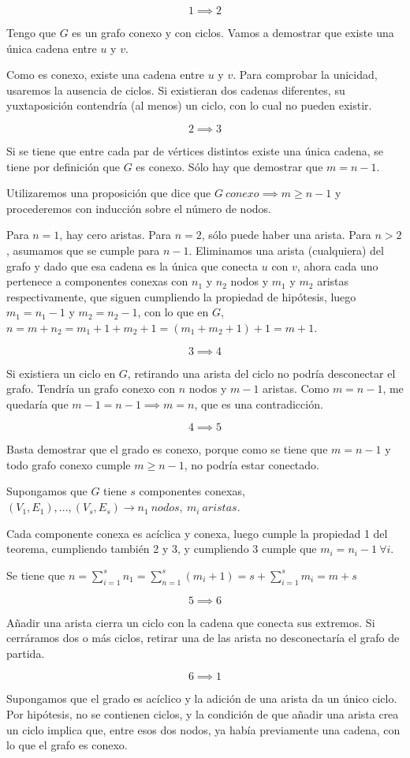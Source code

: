 \documentclass[openany]{book}
\begin{document}
\begin{demonstration}
  $$ 1 \implies 2 $$

  Tengo que $ G $ es un grafo conexo y con ciclos. Vamos a demostrar que existe una única cadena entre $u$ y $v$.

  Como es conexo, existe una cadena entre $u$ y $v$. Para comprobar la unicidad, usaremos la ausencia de ciclos. Si existieran dos cadenas diferentes, su yuxtaposición contendría (al menos) un ciclo, con lo cual no pueden existir.

  $$ 2 \implies 3 $$

  Si se tiene que entre cada par de vértices distintos existe una única cadena, se tiene por definición que $G$ es conexo. Sólo hay que demostrar que $m=n-1$.

  Utilizaremos una proposición que dice que $G\ conexo \implies m \geq n-1$ y procederemos con inducción sobre el número de nodos.

  Para $n=1$, hay cero aristas. Para $n=2$, sólo puede haber una arista. Para $n > 2$, asumamos que se cumple para $n-1$. Eliminamos una arista (cualquiera) del grafo y dado que esa cadena es la única que conecta $u$ con $v$, ahora cada uno pertenece a componentes conexas con $n_1$ y $n_2$ nodos y $m_1$ y $m_2$ aristas respectivamente, que siguen cumpliendo la propiedad de hipótesis, luego $m_1=n_1-1$ y $m_2 = n_2-1$, con lo que en $G$, $n = m + n_2 = m_1 + 1 + m_2 + 1 = (m_1+m_2+1)+1=m+1$.

  $$ 3 \implies 4 $$

  Si existiera un ciclo en $G$, retirando una arista del ciclo no podría desconectar el grafo. Tendría un grafo conexo con $n$ nodos y $m-1$ aristas. Como $m=n-1$, me quedaría que $m-1=n-1 \implies m=n$, que es una contradicción.

  $$ 4 \implies 5 $$

  Basta demostrar que el grado es conexo, porque como se tiene que $m=n-1$ y todo grafo conexo cumple $m \geq  n-1$, no podría estar conectado.

  Supongamos que $G$ tiene $s$ componentes conexas, $(V_1,E_1), ..., (V_s, E_s) \to n_1\ nodos,\ m_i\ aristas$.

  Cada componente conexa es acíclica y conexa, luego cumple la propiedad 1 del teorema, cumpliendo también 2 y 3, y cumpliendo 3 cumple que $m_i=n_i-1\ \forall i$.

  Se tiene que $n= \sum_{i=1}^{s}n_1= \sum_{n=1}^{s}(m_i+1)=s+ \sum_{i=1}^{s}m_i = m+s $

  $$ 5 \implies 6 $$

  Añadir una arista cierra un ciclo con la cadena que conecta sus extremos. Si cerráramos dos o más ciclos, retirar una de las arista no desconectaría el grafo de partida.


  $$ 6 \implies 1 $$

  Supongamos que el grado es acíclico y la adición de una arista da un único ciclo. Por hipótesis, no se contienen ciclos, y la condición de que añadir una arista crea un ciclo implica que, entre esos dos nodos, ya había previamente una cadena, con lo que el grafo es conexo.
  \end{demonstration}
\end{document}
